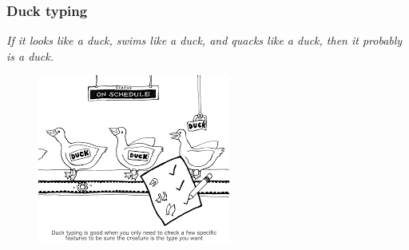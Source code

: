 \documentclass[xcolor ={table,usenames,dvipsnames}]{beamer}
\theoremstyle{definition}
\begin{document}
	
%	
	
	
	

	\begin{frame}
		\frametitle{Duck typing}
		\textit{ If it looks like a duck, swims like a duck, and quacks like a duck, then it probably is a duck.}\\
		\begin{figure}[h!]
			\centering
			\includegraphics[scale=0.85]{img/duck.png}
			\label{Interfacce di un CS}
		\end{figure}
	\end{frame}
\end{document}
